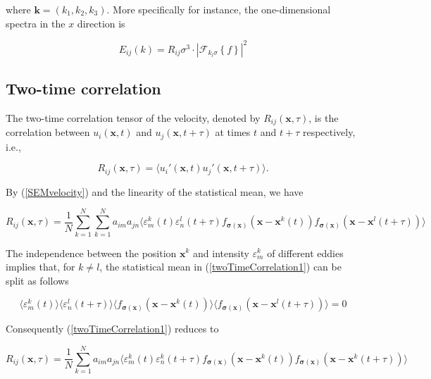 \noindent where $\boldsymbol{k} = (k_1,k_2,k_3)$. More specifically for instance, the one-dimensional spectra in the $x$ direction is

\begin{equation}
E_{ij}(k) = R_{ij}\sigma^3 \cdot |\mathcal{F}_{k_l\sigma}\left\{f\right\}|^2
\end{equation}

\subsection{Two-time correlation}

The two-time correlation tensor of the velocity, denoted by $R_{ij}(\boldsymbol{x},\tau)$, is the correlation between $u_i(\boldsymbol{x},t)$ and $u_j(\boldsymbol{x},t+\tau)$ at times $t$ and $t+\tau$ respectively, i.e.,

\begin{equation} \label{twoTimeCorrelation0}
R_{ij}(\boldsymbol{x},\tau) = \langle u_i'(\boldsymbol{x},t) u_j'(\boldsymbol{x},t+\tau) \rangle.
\end{equation}

\noindent By (\ref{SEMvelocity}) and the linearity of the statistical mean, we have

\begin{equation} \label{twoTimeCorrelation1}
R_{ij}(\boldsymbol{x},\tau) = \frac{1}{N}\sum_{k=1}^N\sum_{k=1}^N a_{im}a_{jn} \langle \varepsilon_m^k(t) \varepsilon_n^l(t+\tau) f_{\boldsymbol{\sigma}(\boldsymbol{x})}(\boldsymbol{x}-\boldsymbol{x}^k(t)) f_{\boldsymbol{\sigma}(\boldsymbol{x})}(\boldsymbol{x}-\boldsymbol{x}^l(t+\tau)) \rangle 
\end{equation}

\noindent The independence between the position $\boldsymbol{x}^k$ and intensity $\varepsilon_m^k$ of different eddies implies that, for $k \neq l$, the statistical mean in (\ref{twoTimeCorrelation1}) can be split as follows

\begin{equation}
\langle \varepsilon_m^k(t) \rangle \langle \varepsilon_n^l(t+\tau) \rangle \langle f_{\boldsymbol{\sigma}(\boldsymbol{x})}(\boldsymbol{x}-\boldsymbol{x}^k(t)) \rangle \langle f_{\boldsymbol{\sigma}(\boldsymbol{x})}(\boldsymbol{x}-\boldsymbol{x}^l(t+\tau)) \rangle = 0
\end{equation}

\noindent Consequently (\ref{twoTimeCorrelation1}) reduces to

\begin{equation} \label{twoTimeCorrelation2}
R_{ij}(\boldsymbol{x},\tau) = \frac{1}{N}\sum_{k=1}^N a_{im}a_{jn} \langle \varepsilon_m^k(t) \varepsilon_n^k(t+\tau) f_{\boldsymbol{\sigma}(\boldsymbol{x})}(\boldsymbol{x}-\boldsymbol{x}^k(t)) f_{\boldsymbol{\sigma}(\boldsymbol{x})}(\boldsymbol{x}-\boldsymbol{x}^k(t+\tau)) \rangle 
\end{equation}

